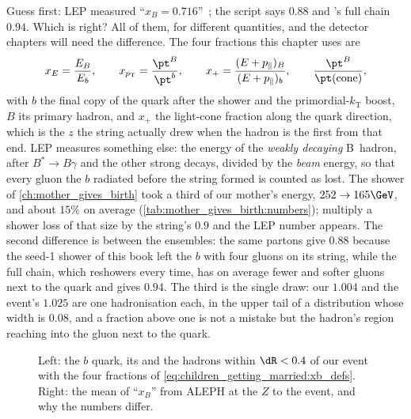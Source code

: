 Guess first: LEP measured ``$x_B=0.716$''~\cite{ALEPH:2001pfo}; the script
says $0.88$ and \PYTHIA's full chain $0.94$. Which is right? All of them,
for different quantities, and the detector chapters will need the
difference. The four fractions this chapter uses are
\begin{equation}
  \xE=\frac{E_B}{E_b},\qquad
  \xpt=\frac{\pt^B}{\pt^b},\qquad
  x_+=\frac{(E+p_\parallel)_B}{(E+p_\parallel)_b},\qquad
  \frac{\pt^B}{\pt(\text{cone})},
  \label{eq:children_getting_married:xb_defs}
\end{equation}
with $b$ the final copy of the quark after the shower and the
primordial-$k_{\mathrm{T}}$ boost, $B$ its primary hadron, and $x_+$ the
light-cone fraction along the quark direction, which is the $z$ the string
actually drew when the hadron is the first from that end. LEP measures
something else: the energy of the \emph{weakly decaying} B~hadron, after
$B^*\to B\gamma$ and the other strong decays, divided by the \emph{beam}
energy, so that every gluon the $b$ radiated before the string formed is
counted as lost. The shower of \cref{ch:mother_gives_birth} took a third of
our mother's energy, $252\to165\GeV$, and about $15\%$ on average
(\cref{tab:mother_gives_birth:numbers}); multiply a shower loss of that
size by the string's $0.9$ and the LEP number appears. The second
difference is between the ensembles: the same partons give $0.88$ because
the seed-1 shower of this book left the $b$ with four gluons on its
string, while the full chain, which reshowers every time, has on average
fewer and softer gluons next to the quark and gives $0.94$. The third is
the single draw: our $1.004$ and the \CMSSW event's $1.025$ are one
hadronisation each, in the upper tail of a distribution whose width is
$0.08$, and a fraction above one is not a mistake but the hadron's region
reaching into the gluon next to the quark.

\begin{figure}[htbp]\centering
\resizebox{\textwidth}{!}{}
\caption[The definitions of $x_B$ and its values in different
settings]{Left: the $b$ quark, its \Bstarbar and the hadrons within
$\dR<0.4$ of our event with the four fractions of
\cref{eq:children_getting_married:xb_defs}. Right: the mean of ``$x_B$''
from ALEPH at the $Z$ to the \CMSSW event, and why the numbers differ.}
\label{fig:children_getting_married:xb_sketch}
\end{figure}

